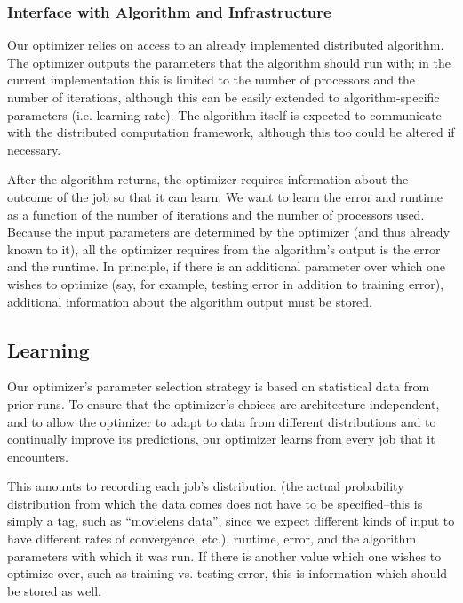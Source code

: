 \subsubsection{Interface with Algorithm and Infrastructure}
Our optimizer relies on access to an already implemented distributed 
algorithm. The optimizer outputs the parameters that the algorithm 
should run with; in the current implementation this is limited to 
the number of processors and the number of iterations, although this
can be easily extended to algorithm-specific parameters (i.e. learning
rate). 
The algorithm itself is expected to communicate with the distributed
computation framework, although this too could be altered if necessary.

After the algorithm returns, the optimizer requires information about
the outcome of the job so that it can learn. We want to learn the error
and runtime as a function of the number of iterations and the number
of processors used. Because the input parameters are determined by the
optimizer (and thus already known to it), all the optimizer requires 
from the algorithm's output is the error and the runtime. In principle,
if there is an additional parameter over which one wishes to optimize
(say, for example, testing error in addition to training error),
additional information about the algorithm output must be stored. 


\subsection{Learning}

Our optimizer's parameter selection strategy is based on statistical 
data from prior runs. 
To ensure that the optimizer's choices are architecture-independent,
and to allow the optimizer to adapt to data from different distributions 
and to continually improve its predictions, our optimizer learns from
every job that it encounters. 

This amounts to recording each job's distribution (the actual probability
distribution from which the data comes does not have to be specified--this
is simply a tag, such as ``movielens data'', since we expect different 
kinds of input to have different rates of convergence, etc.), runtime,
error, and the algorithm parameters with which it was run. If there is
another value which one wishes to optimize over, such as training vs. 
testing error, this is information which should be stored as well. 

